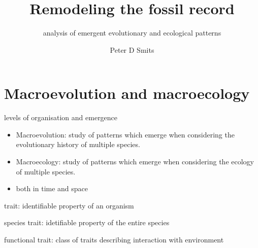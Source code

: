 \documentclass{beamer}
\title{Remodeling the fossil record}
\subtitle{analysis of emergent evolutionary and ecological patterns}
\author{Peter D Smits}
\institute{Committee on Evolutionary Biology, University of Chicago}
\date{}
\begin{document}
\begin{frame}
  \maketitle
\end{frame}

\begin{frame}
  \tableofcontents
\end{frame}

\section{Macroevolution and macroecology}

\begin{frame}
  levels of organisation and emergence
\end{frame}

\begin{frame}
  \begin{definition}
    \begin{itemize}
      \item Macroevolution: study of patterns which emerge when considering the evolutionary history of multiple species.
      \item Macroecology: study of patterns which emerge when considering the ecology of multiple species.
      \item both in time and space
    \end{itemize}
  \end{definition}
\end{frame}

\begin{frame}
  trait: identifiable property of an organism

  species trait: idetifiable property of the entire species

  functional trait: class of traits describing interaction with environment
\end{frame}
\end{document}
